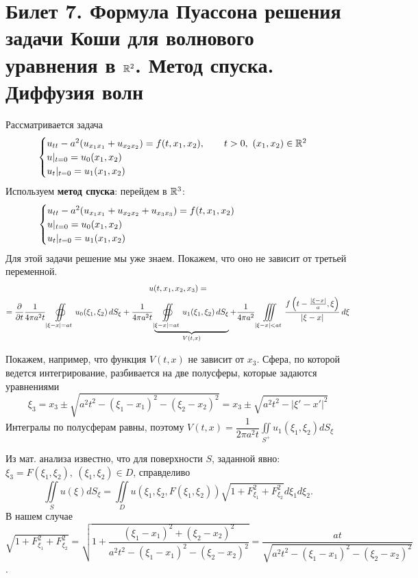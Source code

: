 \documentclass[../main.tex]{subfiles}
\begin{document}
\section{Билет 7. Формула Пуассона решения задачи Коши для волнового уравнения в \texorpdfstring{$\mathbb{R}^2$}{R\textasciicircum 2}. Метод спуска. Диффузия волн}
Рассматривается задача
\begin{equation}
\label{eq::7::cauchy}
\begin{cases}
  u_{tt}-a^2(u_{x_1x_1}+u_{x_2x_2})=f(t,x_1,x_2),\qquad t>0,\ (x_1, x_2)\in \mathbb{R}^2\\
  u|_{t=0}=u_0(x_1, x_2)\\ 
  u_t|_{t=0}=u_1(x_1, x_2)
\end{cases}
\end{equation}
Используем \textbf{метод спуска}: перейдем в $\mathbb{R}^3$:
\begin{equation*}
\begin{cases}
  u_{tt}-a^2(u_{x_1x_1}+u_{x_2x_2}+u_{x_3x_3})=f(t,x_1,x_2) \hspace{7.5em}\\
  u|_{t=0}=u_0(x_1, x_2)\\
  u_t|_{t=0}=u_1(x_1, x_2)
\end{cases}
\end{equation*}
Для этой задачи решение мы уже знаем. Покажем, что оно не зависит от третьей переменной.
\begin{multline*}
u(t, x_1, x_2, x_3) = \\
= \frac{\partial }{\partial t} \frac{1}{4\pi a^2t} \oiint\limits_{|\xi-x|=at} u_0(\xi_1, \xi_2)\, dS_\xi 
+\frac{1}{4\pi a^2t}\underbrace{\oiint\limits_{|\xi-x|=at} u_1(\xi_1, \xi_2)\, dS_{\xi}}_{V(t,x)}
+\frac{1}{4\pi a^2}\iiint\limits_{|\xi - x|<at}\frac{f\left(t-\frac{|\xi - x|}{a}, \xi \right)}{|\xi - x|}\, d\xi
\end{multline*}

Покажем, например, что функция $V(t,x)$ не зависит от $x_3$. Сфера, по которой ведется интегрирование, разбивается на две полусферы, которые задаются уравнениями 
$$\xi_3=x_3\pm \sqrt{a^2t^2-(\xi_1 -x_1)^2-(\xi_2 -x_2)^2}=x_3\pm \sqrt{a^2t^2-|\xi '-x'|^2}$$
Интегралы по полусферам равны, поэтому $V(t,x)=\dfrac{1}{2\pi a^2t}\displaystyle\iint\limits_{S^+}u_1(\xi_1, \xi_2)dS_{\xi}$

Из мат. анализа известно, что для поверхности $S$, заданной явно: $\xi_3=F(\xi_1, \xi_2),\ (\xi_1, \xi_2)\in D$, справделиво 
\[
\iint\limits_S u(\xi )dS_{\xi}=\iint\limits_D u\left( \xi_1, \xi_2, F(\xi_1, \xi_2)\right)\sqrt{1+F_{\xi_1}^2+F_{\xi_2}^2}d\xi_1d\xi_2.
\]
В нашем случае $\sqrt{1+F_{\xi_1}^2+F_{\xi_2}^2}=\sqrt{1+\dfrac{(\xi_1 - x_1)^2+(\xi_2 - x_2)^2}{a^2t^2 - (\xi_1 - x_1)^2-(\xi_2 - x_2)^2}}=\dfrac{at}{\sqrt{a^2t^2 - (\xi_1 - x_1)^2-(\xi_2 - x_2)^2}}$.
\end{document}

